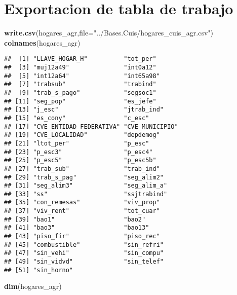 \documentclass[11pt,]{article}
\newenvironment{Shaded}{\begin{snugshade}}{\end{snugshade}}
\newcommand{\KeywordTok}[1]{\textcolor[rgb]{0.13,0.29,0.53}{\textbf{#1}}}
\newcommand{\DataTypeTok}[1]{\textcolor[rgb]{0.13,0.29,0.53}{#1}}
\newcommand{\StringTok}[1]{\textcolor[rgb]{0.31,0.60,0.02}{#1}}
\newcommand{\NormalTok}[1]{#1}
\begin{document}
\section{Exportacion de tabla de
trabajo}\label{exportacion-de-tabla-de-trabajo}

\begin{Shaded}
\begin{Highlighting}[]
\KeywordTok{write.csv}\NormalTok{(hogares_agr,}\DataTypeTok{file=}\StringTok{"../Bases.Cuis/hogares_cuis_agr.csv"}\NormalTok{)}
\KeywordTok{colnames}\NormalTok{(hogares_agr)}
\end{Highlighting}
\end{Shaded}

\begin{verbatim}
##  [1] "LLAVE_HOGAR_H"          "tot_per"               
##  [3] "muj12a49"               "int0a12"               
##  [5] "int12a64"               "int65a98"              
##  [7] "trabsub"                "trabind"               
##  [9] "trab_s_pago"            "segsoc1"               
## [11] "seg_pop"                "es_jefe"               
## [13] "j_esc"                  "jtrab_ind"             
## [15] "es_cony"                "c_esc"                 
## [17] "CVE_ENTIDAD_FEDERATIVA" "CVE_MUNICIPIO"         
## [19] "CVE_LOCALIDAD"          "depdemog"              
## [21] "ltot_per"               "p_esc"                 
## [23] "p_esc3"                 "p_esc4"                
## [25] "p_esc5"                 "p_esc5b"               
## [27] "trab_sub"               "trab_ind"              
## [29] "trab_s_pag"             "seg_alim2"             
## [31] "seg_alim3"              "seg_alim_a"            
## [33] "ss"                     "ssjtrabind"            
## [35] "con_remesas"            "viv_prop"              
## [37] "viv_rent"               "tot_cuar"              
## [39] "bao1"                   "bao2"                  
## [41] "bao3"                   "bao13"                 
## [43] "piso_fir"               "piso_rec"              
## [45] "combustible"            "sin_refri"             
## [47] "sin_vehi"               "sin_compu"             
## [49] "sin_vidvd"              "sin_telef"             
## [51] "sin_horno"
\end{verbatim}

\begin{Shaded}
\begin{Highlighting}[]
\KeywordTok{dim}\NormalTok{(hogares_agr)}
\end{Highlighting}
\end{Shaded}
\end{document}

